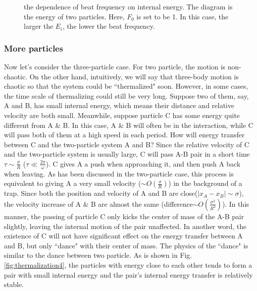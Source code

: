 \documentclass[aps,preprintnumbers,onecolumn,amsmath,amssymb,floatfix,pra]{revtex4-1}
\begin{document}
\begin{figure}[h]
\caption{the dependence of beat frequency on internal energy. The diagram is the energy of two particles. Here, $F_0$ is set to be 1. In this case, the larger the $E_i$, the lower the beat frequency. \label{fig:thermalization1}}%

\end{figure}

\subsubsection{More particles}
Now let's consider the three-particle case. For two particle, the motion is non-chaotic. On the other hand, intuitively, we will say that three-body motion is chaotic so that the system could be ``thermalized" soon. However, in some cases, the time scale of thermalizing could still be very long. Suppose two of them, say, A and B, has small internal energy, which means their distance and relative velocity are both small. Meanwhile, suppose particle C has some energy quite different from A \& B. In this case, A \& B will often be in the interaction, while C will pass both of them at a high speed in each period. How will energy transfer between C and the two-particle system A and B? Since the relative velocity of C and the two-particle system is usually large, C will pass A-B pair in a short time $\tau\sim\frac{\sigma}{R}$ ($\tau\ll\frac{2\pi}{\omega}$). C gives A a push when approaching it, and then push A back when leaving.  As has been discussed in the two-particle case, this process is equivalent to giving A a very small velocity ($\sim O(\frac{\sigma}{R})$) in the background of a trap. Since both the position and velocity of A and B are close($|x_A-x_B|\sim\sigma$), the velocity increase of A \& B are almost the same (difference$\sim O(\frac{\sigma^2}{R^2})$). In this manner, the passing of particle C only kicks the center of mass of the A-B pair slightly, leaving the internal motion of the pair unaffected. In another word, the existence of C will not have significant effect on the energy transfer between A and B, but only ``dance" with their center of mass. The physics of the ``dance" is similar to the dance between two particle. As is shown in Fig.\ref{fig:thermalization4}, the particles with energy close to each other tends to form a pair with small internal energy and the pair's internal energy transfer is relatively stable.
\end{document}
